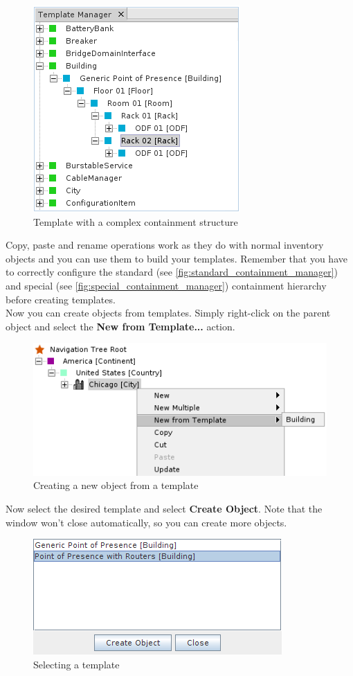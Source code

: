 \documentclass[a4paper]{article}
\begin{document}
	\begin{figure}[h!]
		\centering
		\includegraphics[width=0.4\linewidth]{img/template_manager_template_containment.png}
		\caption{Template with a complex containment structure}
		\label{fig:template_manager_template_containment}
	\end{figure}
	Copy, paste and rename operations work as they do with normal inventory objects and you can use them to build your templates. Remember that you have to correctly configure the standard (see \ref{fig:standard_containment_manager}) and special (see \ref{fig:special_containment_manager}) containment hierarchy before creating templates.\\
	Now you can create objects from templates. Simply right-click on the parent object and select the \textbf{New from Template...} action.\\
	\begin{figure}[h!]
		\centering
		\includegraphics[width=0.6\linewidth]{img/template_manager_new_from_template.png}
		\caption{Creating a new object from a template}
		\label{fig:template_manager_new_from_template}
	\end{figure}
	
	\newpage
	Now select the desired template and select \textbf{Create Object}. Note that the window won't close automatically, so you can create more objects.
	\begin{figure}[h!]
		\centering
		\includegraphics[width=0.5\linewidth]{img/template_manager_select_template.png}
		\caption{Selecting a template}
		\label{fig:template_manager_select_template}
	\end{figure}
	
\end{document}
